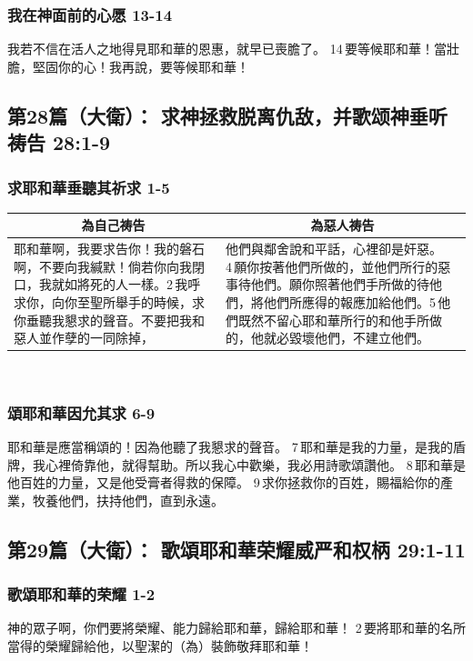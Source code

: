 \subsubsection{我在神面前的心愿 13-14}
我若不信在活人之地得見耶和華的恩惠，就早已喪膽了。
14 要等候耶和華！當壯膽，堅固你的心！我再說，要等候耶和華！


\subsection{第28篇（大衛）： 求神拯救脱离仇敌，并歌颂神垂听祷告 28:1-9}
\subsubsection{求耶和華垂聽其祈求 1-5}
\begin{table}[H]
\centering
\begin{tabular}{p{}|p{9.00cm}}\hline\hline
\multicolumn{1}{c|}{為自己祷告}&\multicolumn{1}{c}{為惡人祷告}\\\hline
耶和華啊，我要求告你！我的磐石啊，不要向我緘默！倘若你向我閉口，我就如將死的人一樣。2 我呼求你，向你至聖所舉手的時候，求你垂聽我懇求的聲音。不要把我和惡人並作孽的一同除掉，
&他們與鄰舍說和平話，心裡卻是奸惡。4 願你按著他們所做的，並他們所行的惡事待他們。願你照著他們手所做的待他們，將他們所應得的報應加給他們。5 他們既然不留心耶和華所行的和他手所做的，他就必毀壞他們，不建立他們。\\\hline
\end{tabular}
\end{table} 
\subsubsection{頌耶和華因允其求 6-9}
耶和華是應當稱頌的！因為他聽了我懇求的聲音。
7 耶和華是我的力量，是我的盾牌，我心裡倚靠他，就得幫助。所以我心中歡樂，我必用詩歌頌讚他。
8 耶和華是他百姓的力量，又是他受膏者得救的保障。
9 求你拯救你的百姓，賜福給你的產業，牧養他們，扶持他們，直到永遠。


\subsection{第29篇（大衛）： 歌頌耶和華荣耀威严和权柄 29:1-11}
\subsubsection{歌頌耶和華的荣耀 1-2}
神的眾子啊，你們要將榮耀、能力歸給耶和華，歸給耶和華！
2 要將耶和華的名所當得的榮耀歸給他，以聖潔的（為）裝飾敬拜耶和華！
